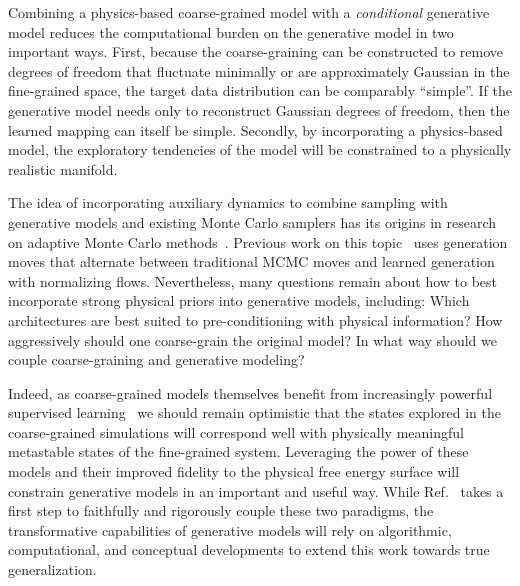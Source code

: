 \documentclass[11pt]{article}
\begin{document}
Combining a physics-based coarse-grained model with a \emph{conditional} generative model reduces the computational burden on the generative model in two important ways.
First, because the coarse-graining can be constructed to remove degrees of freedom that fluctuate minimally or are approximately Gaussian in the fine-grained space, the target data distribution can be comparably ``simple''. 
If the generative model needs only to reconstruct Gaussian degrees of freedom, then the learned mapping can itself be simple. 
Secondly, by incorporating a physics-based model, the exploratory tendencies of the model will be constrained to a physically realistic manifold. 

The idea of incorporating auxiliary dynamics to combine sampling with generative models and existing Monte Carlo samplers has its origins in research on adaptive Monte Carlo methods~\cite{del_moral_adaptive_2012}.
Previous work on this topic~\cite{gabrie_efficient_2021, gabrie_adaptive_2022} uses generation moves that alternate between traditional MCMC moves and learned generation with normalizing flows.
Nevertheless, many questions remain about how to best incorporate strong physical priors into generative models, including: Which architectures are best suited to pre-conditioning with physical information? How aggressively should one coarse-grain the original model? In what way should we couple coarse-graining and generative modeling?

Indeed, as coarse-grained models themselves benefit from increasingly powerful supervised learning~\cite{wang_machine_2019, husic_coarse_2020} we should remain optimistic that the states explored in the coarse-grained simulations will correspond well with physically meaningful metastable states of the fine-grained system. 
Leveraging the power of these models and their improved fidelity to the physical free energy surface will constrain generative models in an important and useful way. 
While Ref.~\cite{chennakesavalu_ensuring_2023} takes a first step to faithfully and rigorously couple these two paradigms, the transformative capabilities of generative models will rely on algorithmic, computational, and conceptual developments to extend this work towards true generalization. 


  
 
\end{document}
